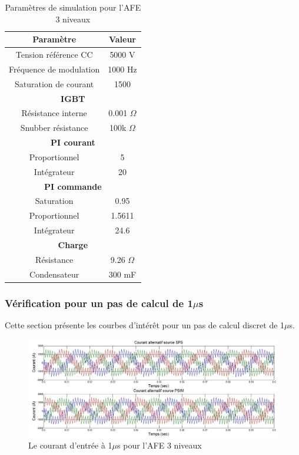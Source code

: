 \documentclass[11pt,letterpaper,final]{report}
\begin{document}
\begin{table}[htb]
\centering
\begin{tabular}{|c|c|} 
  \hline
  \textbf{Paramètre} & \textbf{Valeur}  \\
  \hline\hline
  Tension référence CC & 5000 V\\ \hline
  Fréquence de modulation & 1000 Hz \\ \hline
  Saturation de courant& 1500 \\ \hline \hline
  \multicolumn{2}{|c|}{\textbf{IGBT}}\\ \hline
  Résistance interne & 0.001 $\Omega$\\
  Snubber résistance & 100k $\Omega$\\ \hline \hline
   \multicolumn{2}{|c|}{\textbf{PI courant}}\\ \hline
  Proportionnel & 5 \\
  Intégrateur & 20 \\ \hline \hline
  \multicolumn{2}{|c|}{\textbf{PI commande}}\\ \hline
  Saturation & 0.95\\
  Proportionnel & 1.5611 \\
  Intégrateur & 24.6 \\ \hline \hline
  \multicolumn{2}{|c|}{\textbf{Charge}}\\ \hline
  Résistance & 9.26 $\Omega$ \\
  Condensateur & 300 mF\\
  \hline
\end{tabular}
\caption{Paramètres de simulation pour l'AFE 3 niveaux}
\label{p_AF_3level}
\end{table}

\subsubsection{Vérification pour un pas de calcul de 1$\mu$s}
Cette section présente les courbes d'intérêt pour un pas de calcul discret de 1$\mu$s. 

\begin{figure}[htb]
\centering
\includegraphics[scale=0.5]{Fig/AFE3LEVEL/1u/cour_al.jpg}
\caption{Le courant d'entrée à 1$\mu$s pour l'AFE 3 niveaux}
\label{AF_3_cou}
\end{figure}
\end{document}
